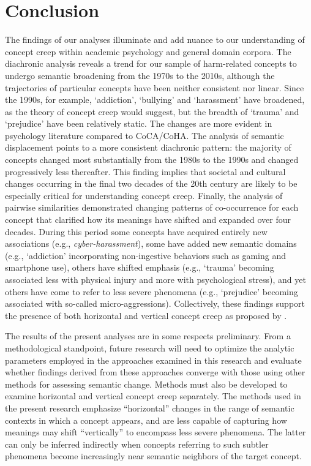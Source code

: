\documentclass[output=paper]{langsci/langscibook}
\begin{document}
\section{Conclusion}
 The findings of our analyses illuminate and add nuance to our understanding of concept creep within academic psychology and general domain corpora. The diachronic analysis reveals a trend for our sample of harm-related concepts to undergo semantic broadening from the 1970s to the 2010s, although the trajectories of particular concepts have been neither consistent nor linear. Since the 1990s, for example, `addiction', `bullying' and `harassment' have broadened, as the theory of concept creep would suggest, but the breadth of `trauma' and `prejudice' have been relatively static. The changes are more evident in psychology literature compared to CoCA/CoHA. The analysis of semantic displacement points to a more consistent diachronic pattern: the majority of concepts changed most substantially from the 1980s to the 1990s and changed progressively less thereafter. This finding implies that societal and cultural changes occurring in the final two decades of the 20th century are likely to be especially critical for understanding concept creep. Finally, the analysis of pairwise similarities demonstrated changing patterns of co-occurrence for each concept that clarified how its meanings have shifted and expanded over four decades. During this period some concepts have acquired entirely new associations (e.g., \textit{cyber-harassment}), some have added new semantic domains (e.g., `addiction' incorporating non-ingestive behaviors such as gaming and smartphone use), others have shifted emphasis (e.g., `trauma' becoming associated less with physical injury and more with psychological stress), and yet others have come to refer to less severe phenomena (e.g., `prejudice' becoming associated with so-called micro-aggressions). Collectively, these findings support the presence of both horizontal and vertical concept creep as proposed by \citet{haslam2016concept}.

The results of the present analyses are in some respects preliminary. From a methodological standpoint, future research will need to optimize the analytic parameters employed in the approaches examined in this research and evaluate whether findings derived from these approaches converge with those using other methods for assessing semantic change. Methods must also be developed to examine horizontal and vertical concept creep separately. The methods used in the present research emphasize ``horizontal'' changes in the range of semantic contexts in which a concept appears, and are less capable of capturing how meanings may shift ``vertically'' to encompass less severe phenomena. The latter can only be inferred indirectly when concepts referring to such subtler phenomena become increasingly near semantic neighbors of the target concept.
\end{document}

